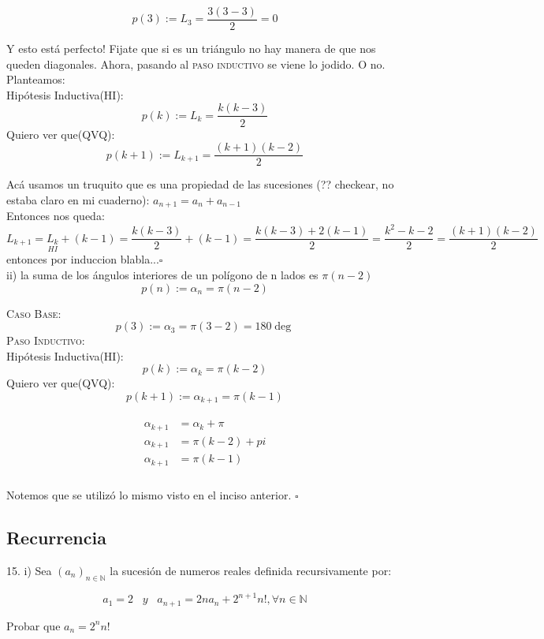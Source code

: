 \documentclass[a4paper,11pt]{article}
\begin{document}
\[p(3) := L_3 = \dfrac{3(3-3)}{2} = 0\]

Y esto está perfecto! Fijate que si es un triángulo no hay manera de que nos queden diagonales. Ahora, pasando al \textsc{paso inductivo} se viene lo jodido. O no. Planteamos:\\
Hipótesis Inductiva(HI):\[ p(k) := L_{k} =\dfrac{k(k-3)}{2} \]
Quiero ver que(QVQ):\[ p(k+1) := L_{k+1} = \dfrac{(k+1)(k-2)}{2} \]

Acá usamos un truquito que es una propiedad de las sucesiones (?? checkear, no estaba claro en mi cuaderno): $a_{n+1} = a_n + a_{n-1}$ \\
Entonces nos queda: \\
$ L_{k+1}  = \underset{HI}{L_k} + (k-1) = \dfrac{k(k-3)}{2} + (k-1) = \dfrac{k(k-3)+2(k-1)}{2} = \dfrac{k^2-k-2}{2}=\dfrac{(k+1)(k-2)}{2}$\\
entonces por induccion blabla...\hfill$\square$\\
ii) la suma de los ángulos interiores de un polígono de n lados es $\pi (n-2)$\\
\[p(n):= \alpha_n = \pi(n-2)\]

\textsc{Caso Base}:\\
\[p(3):= \alpha_3 = \pi(3-2)=180\deg \]
\textsc{Paso Inductivo}:\\
Hipótesis Inductiva(HI):\[p(k):= \alpha_k = \pi(k-2)\]
Quiero ver que(QVQ):\[p(k+1):= \alpha_{k+1} = \pi(k-1)\]

\begin{align*}
\begin{split}
\alpha_{k+1} & = \alpha_k + \pi \\
\alpha_{k+1} & = \pi (k-2) + pi \\
\alpha_{k+1} & = \pi (k - 1) \\
\end{split}
\end{align*}

Notemos que se utilizó lo mismo visto en el inciso anterior.
\hfill$\square$
\subsection{Recurrencia}
15. i) Sea $(a_n)_{n \in \mathbb{N}}$ la sucesión de numeros reales definida recursivamente por: 

\[a_1 = 2 \;\;\;y\;\;\; a_{n+1}=2n a_n + 2^{n+1} n!, \forall n \in \mathbb{N} \]

Probar que $a_n = 2^n n!$\\
\end{document}
